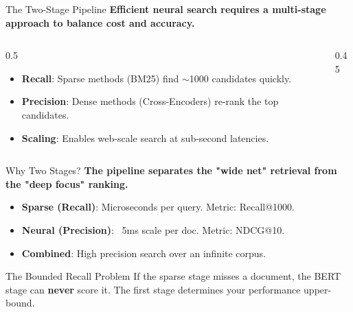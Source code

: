 \documentclass[aspectratio=169]{beamer}
\newif\ifanimated
\newcommand{\cpause}{\ifanimated\pause\fi}
\begin{document}
\begin{frame}[shrink=15]{The Two-Stage Pipeline}
\textbf{Efficient neural search requires a multi-stage approach to balance cost and accuracy.}

\vspace{0.8em}
\begin{columns}
\begin{column}{0.5\textwidth}
\begin{itemize}
    \item \textbf{Recall}: Sparse methods (BM25) find $\sim$1000 candidates quickly.
    \item \textbf{Precision}: Dense methods (Cross-Encoders) re-rank the top candidates.
    \item \textbf{Scaling}: Enables web-scale search at sub-second latencies.
\end{itemize}\cpause
\end{column}

\begin{column}{0.45\textwidth}
\begin{center}

\end{center}
\end{column}
\end{columns}
\end{frame}

\begin{frame}{Why Two Stages?}
\textbf{The pipeline separates the "wide net" retrieval from the "deep focus" ranking.}

\vspace{0.8em}
\begin{itemize}
    \item \textbf{Sparse (Recall)}: Microseconds per query. Metric: Recall@1000.
    \item \textbf{Neural (Precision)}: ~5ms scale per doc. Metric: NDCG@10.
    \item \textbf{Combined}: High precision search over an infinite corpus.
\end{itemize}\cpause

\vspace{1em}
\cpause
\begin{alertblock}{The Bounded Recall Problem}
If the sparse stage misses a document, the BERT stage can \textbf{never} score it. The first stage determines your performance upper-bound.
\end{alertblock}
\end{frame}
\end{document}
